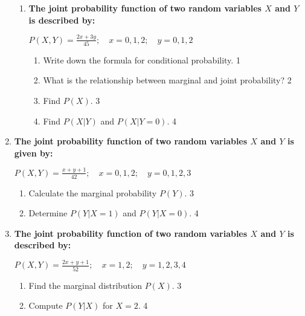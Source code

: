 \documentclass[a4paper,oneside, margin=1.4in]{book}
\begin{document}
\begin{enumerate}
\begin{enumerate}
  \item
  \textbf{The joint probability function of two random variables \( X \) and \( Y \) is described by:}
  
  \begin{center}
  \( \displaystyle P(X,Y) = \frac{2x + 3y}{45}; \quad x = 0, 1, 2; \quad y = 0, 1, 2 \)
  \end{center}
 
  \begin{enumerate}
    \item
    	Write down the formula for conditional probability. \hfill 1
    \item
    	What is the relationship between marginal and joint probability? \hfill 2
    \item
    	Find \( P(X) \). \hfill 3
    \item
     	Find \( P(X \vert Y) \) and \( P(X \vert Y = 0) \). \hfill 4
  \end{enumerate}

\end{enumerate}

  
  \item
  \textbf{The joint probability function of two random variables \( X \) and \( Y \) is given by:}
  
  \begin{center}
  \( \displaystyle P(X,Y) = \frac{x + y + 1}{42}; \quad x = 0, 1, 2; \quad y = 0, 1, 2, 3 \)
  \end{center}
 
  \begin{enumerate}
    \item
    	Calculate the marginal probability \( P(Y) \). \hfill 3
    \item
     	Determine \( P(Y \vert X = 1) \) and \( P(Y \vert X = 0) \). \hfill 4
  \end{enumerate}

  \item
  \textbf{The joint probability function of two random variables \( X \) and \( Y \) is described by:}
  
  \begin{center}
  \( \displaystyle P(X,Y) = \frac{2x + y + 1}{52}; \quad x = 1, 2; \quad y = 1, 2, 3, 4 \)
  \end{center}
 
  \begin{enumerate}
    \item
    	Find the marginal distribution \( P(X) \). \hfill 3
    \item
     	Compute \( P(Y \vert X) \) for \( X = 2 \). \hfill 4
  \end{enumerate}
  

\end{enumerate}
\end{document}
